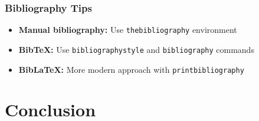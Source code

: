 \documentclass[aspectratio=169,professionalfonts]{beamer}
\begin{document}
\begin{frame}
    \frametitle{Bibliography Tips}
    
    \begin{tcolorbox}[colback=ugmLightGrey,colframe=ugmBlue,title=Bibliography Options]
        \begin{itemize}
            \item \textbf{Manual bibliography:} Use \texttt{thebibliography} environment
            \item \textbf{BibTeX:} Use \texttt{bibliographystyle} and \texttt{bibliography} commands
            \item \textbf{BibLaTeX:} More modern approach with \texttt{printbibliography}
        \end{itemize}
    \end{tcolorbox}
    
        
% 
% 

\end{frame}

\section{Conclusion}
\end{document}
